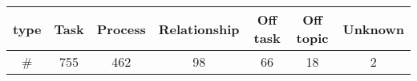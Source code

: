 \begin{tabular}{c|c|c|c|c|c|c}
type&Task&Process&Relationship&Off task&Off topic&Unknown\\\hline
\#&755&462&98&66&18&2\\
\end{tabular}
